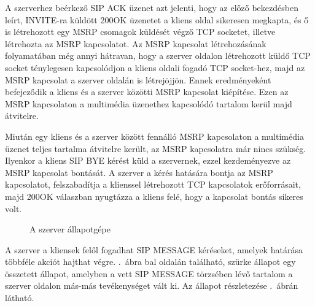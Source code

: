 A szerverhez beérkező SIP ACK üzenet azt jelenti, hogy az előző bekezdésben leírt, INVITE-ra küldött 200OK üzenetet a kliens oldal sikeresen megkapta, és ő is létrehozott egy MSRP csomagok küldését végző TCP socketet, illetve létrehozta az MSRP kapcsolatot. Az MSRP kapcsolat létrehozásának folyamatában még annyi hátravan, hogy a szerver oldalon létrehozott küldő TCP socket ténylegesen kapcsolódjon a kliens oldali fogadó TCP socket-hez, majd az MSRP kapcsolat a szerver oldalán is létrejöjjön. Ennek eredményeként befejeződik a kliens és a szerver közötti MSRP kapcsolat kiépítése. Ezen az MSRP kapcsolaton a multimédia üzenethez kapcsolódó tartalom kerül majd átvitelre.

Miután egy kliens és a szerver között fennálló MSRP kapcsolaton a multimédia üzenet teljes tartalma átvitelre került, az MSRP kapcsolatra már nincs szükség. Ilyenkor a kliens SIP BYE kérést küld a szervernek, ezzel kezdeményezve az MSRP kapcsolat bontását. A szerver a kérés hatására bontja az MSRP  kapcsolatot, felszabadítja a klienssel létrehozott TCP kapcsolatok erőforrásait, majd 200OK válaszban nyugtázza a kliens felé, hogy a kapcsolat bontás sikeres volt.

\begin{figure}[htbp]
\center
{}
\caption{A szerver állapotgépe}
\label{fig:server_statemachine_full}
\end{figure}

A szerver a kliensek felől fogadhat SIP MESSAGE kéréseket, amelyek határása többféle akciót hajthat végre. .~ábra bal oldalán található, szürke állapot egy összetett állapot, amelyben a vett SIP MESSAGE törzsében lévő tartalom a szerver oldalon más-más tevékenységet vált ki. Az állapot részletezése .~ábrán látható.

